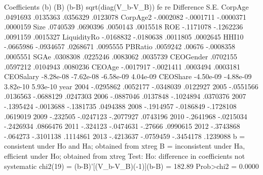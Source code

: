 {\smallskip}
                  Coefficients 
             {\VBAR}      (b)          (B)            (b-B)     sqrt(diag(V_b-V_B))
             {\VBAR}       fe           re         Difference          S.E.
     CorpAge {\VBAR}    .0491693     .0135363        .0356329        .0123078
    CorpAge2 {\VBAR}   -.0002082    -.0001711       -.0000371        .0000159
        Size {\VBAR}    .0740539     .0690396        .0050143        .0015518
         ROE {\VBAR}   -.1171078    -.1262236        .0091159        .0015327
LiquidityR{\tytilde}o {\VBAR}   -.0168832    -.0180638        .0011805        .0002645
       HHI10 {\VBAR}   -.0665986    -.0934657        .0268671        .0095555
     PBRatio {\VBAR}    .0059242       .00676       -.0008358        .0005551
        SGAe {\VBAR}    .0308308     .0225246        .0083062        .0035739
   CEOGender {\VBAR}    .0702155     .0597212        .0104943        .0080236
      CEOAge {\VBAR}   -.0017917    -.0021411        .0003494        .0003181
   CEOSalary {\VBAR}   -8.28e-08    -7.62e-08       -6.58e-09        4.04e-09
    CEOShare {\VBAR}   -4.50e-09    -4.88e-09        3.82e-10        5.93e-10
        year {\VBAR}
       2004  {\VBAR}   -.0295862     .0052177       -.0348039        .0122927
       2005  {\VBAR}   -.0551566     .0136563       -.0688129        .0247303
       2006  {\VBAR}   -.0887046     .0137848       -.1024894        .0370376
       2007  {\VBAR}   -.1395424    -.0013688       -.1381735        .0494388
       2008  {\VBAR}   -.1914957    -.0186849       -.1728108        .0619019
       2009  {\VBAR}    -.232505    -.0247123       -.2077927        .0743196
       2010  {\VBAR}   -.2641968    -.0215034       -.2426934        .0866476
       2011  {\VBAR}    -.324123    -.0474631         -.27666        .0990615
       2012  {\VBAR}   -.3743868     -.064273       -.3101138        .1114861
       2013  {\VBAR}   -.4213637    -.0759459       -.3454178        .1239088
                           b = consistent under Ho and Ha; obtained from xtreg
            B = inconsistent under Ha, efficient under Ho; obtained from xtreg
{\smallskip}
    Test:  Ho:  difference in coefficients not systematic
{\smallskip}
                 chi2(19) = (b-B)'[(V_b-V_B){\caret}(-1)](b-B)
                          =      182.89
                Prob>chi2 =      0.0000
{\smallskip}

